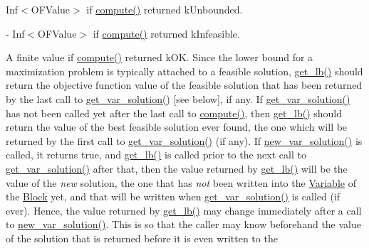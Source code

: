 \begin{DoxyItemize}
\item Inf$<$\+O\+F\+Value$>$ if \mbox{\hyperlink{class_s_m_spp__di__unipi__it_1_1_m_c_f_solver_afc8ff54ab05d22f4cca0fb0bfbeb7a49}{compute()}} returned k\+Unbounded.
\item -\/ Inf$<$\+O\+F\+Value$>$ if \mbox{\hyperlink{class_s_m_spp__di__unipi__it_1_1_m_c_f_solver_afc8ff54ab05d22f4cca0fb0bfbeb7a49}{compute()}} returned k\+Infeasible.
\item A finite value if \mbox{\hyperlink{class_s_m_spp__di__unipi__it_1_1_m_c_f_solver_afc8ff54ab05d22f4cca0fb0bfbeb7a49}{compute()}} returned k\+OK. Since the lower bound for a maximization problem is typically attached to a feasible solution, \mbox{\hyperlink{class_s_m_spp__di__unipi__it_1_1_m_c_f_solver_a064e49220c7f623cd53edbee8313c753}{get\+\_\+lb()}} should return the objective function value of the feasible solution that has been returned by the last call to \mbox{\hyperlink{class_s_m_spp__di__unipi__it_1_1_m_c_f_solver_ac83fa9679882440d13fb5940494699c5}{get\+\_\+var\+\_\+solution()}} \mbox{[}see below\mbox{]}, if any. If \mbox{\hyperlink{class_s_m_spp__di__unipi__it_1_1_m_c_f_solver_ac83fa9679882440d13fb5940494699c5}{get\+\_\+var\+\_\+solution()}} has not been called yet after the last call to \mbox{\hyperlink{class_s_m_spp__di__unipi__it_1_1_m_c_f_solver_afc8ff54ab05d22f4cca0fb0bfbeb7a49}{compute()}}, then \mbox{\hyperlink{class_s_m_spp__di__unipi__it_1_1_m_c_f_solver_a064e49220c7f623cd53edbee8313c753}{get\+\_\+lb()}} should return the value of the best feasible solution ever found, the one which will be returned by the first call to \mbox{\hyperlink{class_s_m_spp__di__unipi__it_1_1_m_c_f_solver_ac83fa9679882440d13fb5940494699c5}{get\+\_\+var\+\_\+solution()}} (if any). If \mbox{\hyperlink{class_s_m_spp__di__unipi__it_1_1_m_c_f_solver_a62678dc9f7485d5a2992c588c5dc7d49}{new\+\_\+var\+\_\+solution()}} is called, it returns true, and \mbox{\hyperlink{class_s_m_spp__di__unipi__it_1_1_m_c_f_solver_a064e49220c7f623cd53edbee8313c753}{get\+\_\+lb()}} is called prior to the next call to \mbox{\hyperlink{class_s_m_spp__di__unipi__it_1_1_m_c_f_solver_ac83fa9679882440d13fb5940494699c5}{get\+\_\+var\+\_\+solution()}} after that, then the value returned by \mbox{\hyperlink{class_s_m_spp__di__unipi__it_1_1_m_c_f_solver_a064e49220c7f623cd53edbee8313c753}{get\+\_\+lb()}} will be the value of the {\itshape new} solution, the one that has {\itshape not} been written into the \mbox{\hyperlink{class_s_m_spp__di__unipi__it_1_1_variable}{Variable}} of the \mbox{\hyperlink{class_s_m_spp__di__unipi__it_1_1_block}{Block}} yet, and that will be written when \mbox{\hyperlink{class_s_m_spp__di__unipi__it_1_1_m_c_f_solver_ac83fa9679882440d13fb5940494699c5}{get\+\_\+var\+\_\+solution()}} is called (if ever). Hence, the value returned by \mbox{\hyperlink{class_s_m_spp__di__unipi__it_1_1_m_c_f_solver_a064e49220c7f623cd53edbee8313c753}{get\+\_\+lb()}} may change immediately after a call to \mbox{\hyperlink{class_s_m_spp__di__unipi__it_1_1_m_c_f_solver_a62678dc9f7485d5a2992c588c5dc7d49}{new\+\_\+var\+\_\+solution()}}. This is so that the caller may know beforehand the value of the solution that is returned before it is even written to the 
\end{DoxyItemize}
